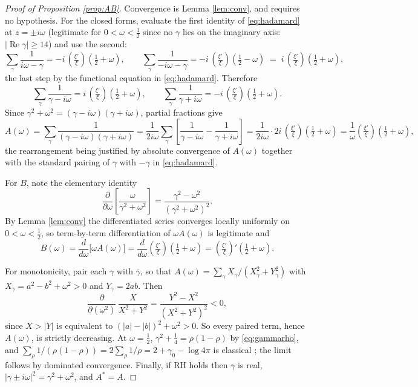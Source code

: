 \documentclass[11pt,reqno]{amsart}
\theoremstyle{plain}
\theoremstyle{definition}
\newcommand{\Rp}{\operatorname{Re}}
\newcommand{\lxi}[1]{\left(\tfrac{\xi'}{\xi}\right)\!#1}
\begin{document}
\begin{proof}[Proof of Proposition \ref{prop:AB}]
Convergence is Lemma \ref{lem:conv}, and requires no hypothesis. For the closed forms, evaluate the
first identity of \eqref{eq:hadamard} at $z=\pm i\omega$ (legitimate for $0<\omega<\tfrac12$ since
no $\gamma$ lies on the imaginary axis: $|\Rp\gamma|\ge14$) and use the second:
\[
  \sum_\gamma\frac{1}{i\omega-\gamma}=-i\,\lxi{\left(\tfrac12+\omega\right)},
  \qquad
  \sum_\gamma\frac{1}{-i\omega-\gamma}=-i\,\lxi{\left(\tfrac12-\omega\right)}
  \;=\;i\,\lxi{\left(\tfrac12+\omega\right)},
\]
the last step by the functional equation in \eqref{eq:hadamard}. Therefore
\[
  \sum_\gamma\frac{1}{\gamma-i\omega}=i\,\lxi{\left(\tfrac12+\omega\right)},
  \qquad
  \sum_\gamma\frac{1}{\gamma+i\omega}=-i\,\lxi{\left(\tfrac12+\omega\right)} .
\]
Since $\gamma^{2}+\omega^{2}=(\gamma-i\omega)(\gamma+i\omega)$, partial fractions give
\[
  A(\omega)=\sum_\gamma\frac{1}{(\gamma-i\omega)(\gamma+i\omega)}
  =\frac{1}{2i\omega}\sum_\gamma\left[\frac{1}{\gamma-i\omega}-\frac{1}{\gamma+i\omega}\right]
  =\frac{1}{2i\omega}\cdot 2i\,\lxi{\left(\tfrac12+\omega\right)}
  =\frac1\omega\lxi{\left(\tfrac12+\omega\right)},
\]
the rearrangement being justified by absolute convergence of $A(\omega)$ together with the standard
pairing of $\gamma$ with $-\gamma$ in \eqref{eq:hadamard}.

For $B$, note the elementary identity
\[
  \frac{\partial}{\partial\omega}\left[\frac{\omega}{\gamma^{2}+\omega^{2}}\right]
  =\frac{\gamma^{2}-\omega^{2}}{(\gamma^{2}+\omega^{2})^{2}} .
\]
By Lemma \ref{lem:conv} the differentiated series converges locally uniformly on
$0<\omega<\tfrac12$, so term-by-term differentiation of $\omega A(\omega)$ is legitimate and
\[
  B(\omega)=\frac{d}{d\omega}\bigl[\omega A(\omega)\bigr]
  =\frac{d}{d\omega}\lxi{\left(\tfrac12+\omega\right)}
  =\lxi{'\left(\tfrac12+\omega\right)} .
\]

For monotonicity, pair each $\gamma$ with $\overline\gamma$, so that
$A(\omega)=\sum_\gamma X_\gamma/(X_\gamma^{2}+Y_\gamma^{2})$ with
$X_\gamma=a^{2}-b^{2}+\omega^{2}>0$ and $Y_\gamma=2ab$. Then
\[
  \frac{\partial}{\partial(\omega^{2})}\,\frac{X}{X^{2}+Y^{2}}
  =\frac{Y^{2}-X^{2}}{(X^{2}+Y^{2})^{2}}<0,
\]
since $X>|Y|$ is equivalent to $(|a|-|b|)^{2}+\omega^{2}>0$. So every paired term, hence
$A(\omega)$, is strictly decreasing. At $\omega=\tfrac12$, $\gamma^{2}+\tfrac14=\rho(1-\rho)$ by
\eqref{eq:gammarho}, and $\sum_\rho 1/(\rho(1-\rho))=2\sum_\rho 1/\rho=2+\gamma_0-\log4\pi$ is
classical \cite[\S12]{Davenport}; the limit follows by dominated convergence. Finally, if RH holds
then $\gamma$ is real, $|\gamma\pm i\omega|^{2}=\gamma^{2}+\omega^{2}$, and $A^{*}=A$.
\end{proof}
\end{document}

